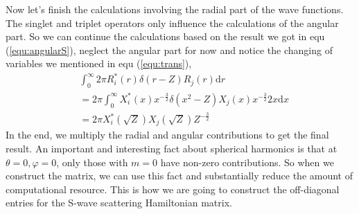\documentclass[british,english]{article}
\numberwithin{equation}{section}
\numberwithin{figure}{section}
\begin{document}
Now let's finish the calculations involving the radial part of the wave functions. The singlet and triplet operators only influence the calculations of the angular part. So we can continue the calculations based on the result we got in equ (\ref{equ:angularS}), neglect the angular part for now and  notice the changing of variables we mentioned in equ (\ref{equ:trans}),
\begin{equation}
\begin{aligned}
&\int_0^{\infty} 2\pi R^*_i( r)\delta(r - Z)R_j(r)\mathrm dr\\
&= 2\pi \int_0^{\infty} X^*_i(x)x^{-\frac{3}{2}}\delta(x^2-Z)X_j(x)x^{-\frac{3}{2}}2x\mathrm dx\\
&= 2\pi X_i^*(\sqrt{Z})X_j(\sqrt{Z})Z^{-\frac{3}{2}}
\end{aligned}
\end{equation}
In the end, we multiply the radial and angular contributions to get the final result. An important and interesting fact about spherical harmonics is that at $\theta=0, \varphi=0$, only those with $m=0$ have non-zero contributions. So when we construct the matrix, we can use this fact and substantially reduce the amount of computational resource. This is how we are going to construct the off-diagonal entries for the S-wave scattering Hamiltonian matrix.
\end{document}
